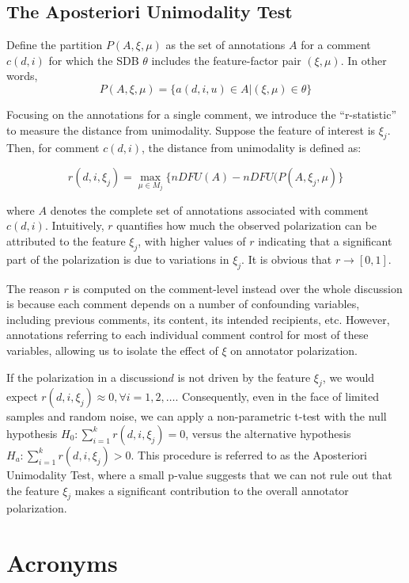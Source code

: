 \documentclass{article}
\begin{document}
\subsection{The Aposteriori Unimodality Test}

Define the partition $P(A,\xi, \mu)$ as the set of annotations $A$ for a comment $c(d, i)$ for which the \ac{SDB} $\theta$ includes the feature-factor pair $(\xi, \mu)$. In other words,
\begin{equation}
    P(A, \xi, \mu) = \{a(d, i, u) \in A | (\xi, \mu) \in \theta\}
\end{equation}

Focusing on the annotations for a single comment, we introduce the “r-statistic” to measure the distance from unimodality. Suppose the feature of interest is $\xi_j$. Then, for comment $c(d, i)$, the distance from unimodality is defined as:

\begin{equation}
    r(d, i, \xi_j) = \max_{\mu \in M_j}\{nDFU(A) - nDFU(P(A, \xi_j, \mu)\}
\end{equation}

\noindent where $A$ denotes the complete set of annotations associated with comment $c(d, i)$. Intuitively, $r$ quantifies how much the observed polarization can be attributed to the feature $\xi_j$, with higher values of $r$ indicating that a significant part of the polarization is due to variations in $\xi_j$. It is obvious that $r \rightarrow [0,1]$.

The reason $r$ is computed on the comment-level instead over the whole discussion is because each comment depends on a number of confounding variables, including previous comments, its content, its intended recipients, etc. However, annotations referring to each individual comment control for most of these variables, allowing us to isolate the effect of $\xi$ on annotator polarization.

If the polarization in a discussion$d$ is not driven by the feature $\xi_j$, we would expect $r(d, i, \xi_j) \approx 0, \forall i=1, 2, \ldots$. Consequently, even in the face of limited samples and random noise, we can apply a non-parametric t-test with the null hypothesis $H_0: \sum_{i=1}^k r(d, i, \xi_j) = 0$, versus the alternative hypothesis $H_a: \sum_{i=1}^k r(d, i, \xi_j) > 0$. This procedure is referred to as the Aposteriori Unimodality Test, where a small p-value suggests that we can not rule out that the feature $\xi_j$ makes a significant contribution to the overall annotator polarization.


\section{Acronyms}

\begin{acronym}[WWW]
\end{acronym}
\end{document}
